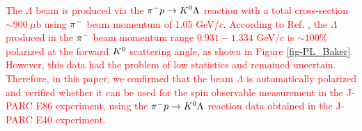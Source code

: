 \textcolor{red}{The $\Lambda$ beam is produced via the $\pi^- p \to K^0 \Lambda$ reaction with a total cross-section $\sim900\ \mu$b \cite{Baker} using $\pi^{-}$ beam momentum of 1.05 GeV/$c$. According to Ref. \cite{Baker}, the $\Lambda$ produced in the $\pi^{-}$ beam momentum range $0.931-1.334$ GeV/$c$ is $\sim100\%$ polarized at the forward $K^{0}$ scattering angle, as shown in Figure \ref{fig-PL_Baker}. However, this data had the problem of low statistics and remained uncertain. Therefore, in this paper, we confirmed that the beam $\Lambda$ is automatically polarized and verified whether it can be used for the spin observable measurement in the J-PARC E86 experiment, using the $\pi^- p \to K^0 \Lambda$ reaction data obtained in the J-PARC E40 experiment.}

\begin{comment}

Figure \ref{fig-E86setup} shows the experimental setup of J-PARC E86 \cite{Miwa-LpProp}. To reconstruct $\Kz$, $\pP$ and $\pM$ from the $\kzdecay$ decay will be detected by the forward magnetic spectrometer (SKS) \cite{K1.8} and the CATCH system, respectively. \textcolor{red}{ The momentum resolution of SKS is $\Delta p/p = 10^{-3}$ (FWHM), which is 10 times better than KURAMA, which should improve the missing mass resolution. As a result, the S/N ratio of $\Lambda$ identification is expected to be improved. }


\end{comment}
